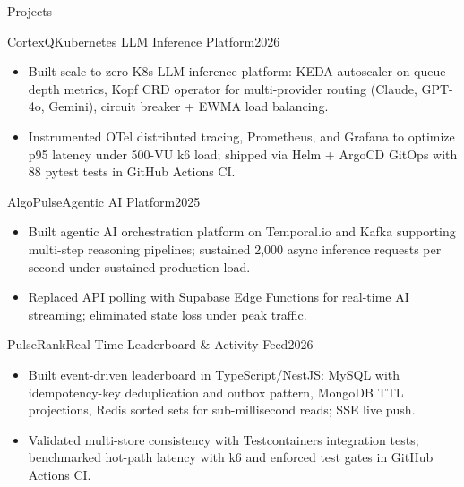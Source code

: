 \documentclass[]{mcdowellcv}
\begin{document}
\begin{cvsection}{Projects}
  \begin{cvsubsection}{CortexQ}{Kubernetes LLM Inference Platform}{2026}
    \begin{itemize}
      \item Built scale-to-zero K8s LLM inference platform: KEDA autoscaler on queue-depth metrics, Kopf CRD operator for multi-provider routing (Claude, GPT-4o, Gemini), circuit breaker + EWMA load balancing.
      \item Instrumented OTel distributed tracing, Prometheus, and Grafana to optimize p95 latency under 500-VU k6 load; shipped via Helm + ArgoCD GitOps with 88 pytest tests in GitHub Actions CI.
    \end{itemize}
    \vspace{-1.5pt}
  \end{cvsubsection}

  \begin{cvsubsection}{AlgoPulse}{Agentic AI Platform}{2025}
    \begin{itemize}
      \item Built agentic AI orchestration platform on Temporal.io and Kafka supporting multi-step reasoning pipelines; sustained 2,000 async inference requests per second under sustained production load.
      \item Replaced API polling with Supabase Edge Functions for real-time AI streaming; eliminated state loss under peak traffic.
    \end{itemize}
    \vspace{-1.5pt}
  \end{cvsubsection}

  \begin{cvsubsection}{PulseRank}{Real-Time Leaderboard \& Activity Feed}{2026}
    \begin{itemize}
      \item Built event-driven leaderboard in TypeScript/NestJS: MySQL with idempotency-key deduplication and outbox pattern, MongoDB TTL projections, Redis sorted sets for sub-millisecond reads; SSE live push.
      \item Validated multi-store consistency with Testcontainers integration tests; benchmarked hot-path latency with k6 and enforced test gates in GitHub Actions CI.
    \end{itemize}
  \end{cvsubsection}
\end{cvsection}
\end{document}
